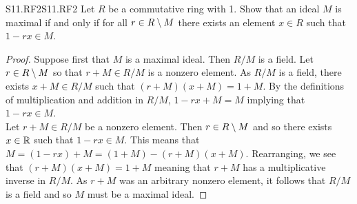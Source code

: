 \documentclass[../AlgebraQualSolutions.tex]{subfiles}
\begin{document}
\begin{prob}{S11.RF2}{S11.RF2}
	Let $R$ be a commutative ring with 1. Show that an ideal $M$ is maximal if and only if for all $r \in R \setminus M$ there exists an element $x \in R$ such that $1 - rx \in M$.
\end{prob}

\begin{proof}
	Suppose first that $M$ is a maximal ideal. Then $R/M$ is a field. Let $r \in R \setminus M$ so that $r + M \in R/M$ is a nonzero element. As $R/M$ is a field, there exists $x + M \in R/M$ such that $(r + M)(x + M) = 1 + M$. By the definitions of multiplication and addition in $R/M$, $1 - rx + M = M$ implying that $1 - rx \in M$.\\

	Let $r + M \in R/M$ be a nonzero element. Then $r \in R \setminus M$ and so there exists $x \in \mathbb{R}$ such that $1 - rx \in M$. This means that $M = (1 - rx) + M = (1 + M) - (r + M)(x + M)$. Rearranging, we see that $(r + M)(x + M) = 1 + M$ meaning that $r + M$ has a multiplicative inverse in $R/M$. As $r + M$ was an arbitrary nonzero element, it follows that $R/M$ is a field and so $M$ must be a maximal ideal.
\end{proof}
\end{document}

